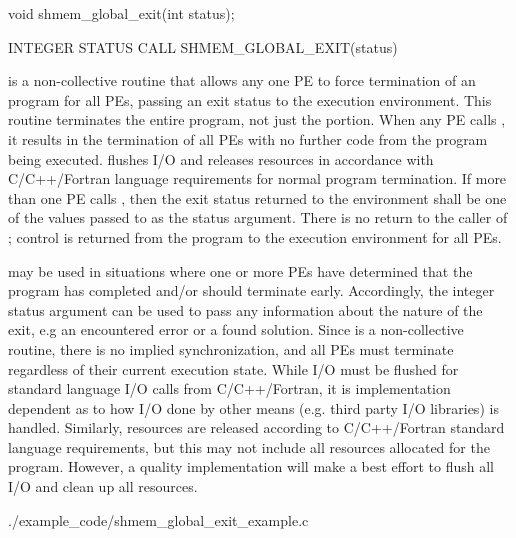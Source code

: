 
\begin{apidefinition}

\begin{Csynopsis}
void shmem_global_exit(int status);
\end{Csynopsis}

\begin{Fsynopsis}
INTEGER STATUS
CALL SHMEM_GLOBAL_EXIT(status)
\end{Fsynopsis}

\begin{apiarguments}
\end{apiarguments}

\apidescription
{
     is a non-collective routine that allows any one
    \ac{PE} to force termination of an \openshmem program for all \acp{PE},
    passing an exit status to the execution environment. This routine
    terminates the entire program, not just the \openshmem portion. When any
    \ac{PE} calls , it results in the termination of
    all \acp{PE} with no further code from the program being executed.
     flushes I/O and releases resources in accordance
    with C/C++/Fortran language requirements for normal program termination. If
    more than one \ac{PE} calls , then the exit
    status returned to the environment shall be one of the values passed to
     as the status argument.  There is no return to
    the caller of ; control is returned from the
    \openshmem program to the execution environment for all \acp{PE}.
}



\apinotes
{ 
     may be used in situations where one or more
    \acp{PE} have determined that the program has completed and/or should
    terminate early.  Accordingly, the integer status argument can be used to
    pass any information about the nature of the exit, e.g an encountered error
    or a found solution.  Since  is a non-collective
    routine, there is no implied synchronization, and all \acp{PE} must
    terminate regardless of their current execution state. While I/O must be
    flushed for standard language I/O calls from C/C++/Fortran, it is
    implementation dependent as to how I/O done by other means (e.g. third
    party I/O libraries) is handled. Similarly, resources are released
    according to C/C++/Fortran standard language requirements, but this may not
    include all resources allocated for the \openshmem program. However, a
    quality implementation will make a best effort to flush all I/O and clean
    up all resources.
}

\begin{apiexamples}

\apicexample
    {}
    {./example_code/shmem_global_exit_example.c}
    {}

\end{apiexamples}

\end{apidefinition}
